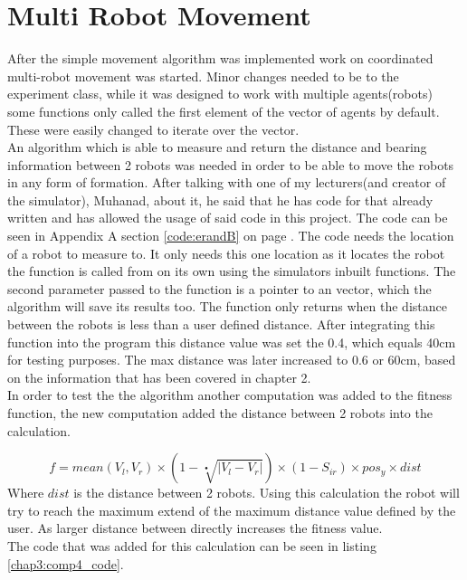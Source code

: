 \section{Multi Robot Movement}
After the simple movement algorithm was implemented work on coordinated multi-robot movement was started.
Minor changes needed to be to the experiment class, while it was designed to work with multiple agents(robots) some functions only called the first element of the vector of agents by default. These were easily changed to iterate over the vector. \\

An algorithm which is able to measure and return the distance and bearing information between 2 robots was needed in order to be able to move the robots in any form of formation. After talking with one of my lecturers(and creator of the simulator), Muhanad,  about it, he said that he has code for that already written and has allowed the usage of said code in this project. The code can be seen in Appendix A section \ref{code:erandB} on page \pageref{code:erandB}.
The code needs the location of a robot to measure to. It only needs this one location as it locates the robot the function is called from on its own using the simulators inbuilt functions.  The second parameter passed to the function is a pointer to an vector, which the algorithm will save its results too. 
The function only returns when the distance between the robots is less than a user defined distance. After integrating this function into the program this distance value was set the 0.4, which equals 40cm for testing purposes. 
The max distance was later increased to 0.6 or 60cm, based on the information that has been covered in chapter 2. \\

In order to test the the algorithm another computation was added to the fitness function, the new computation added the distance between 2 robots into the calculation.

\begin{equation}
f = mean(V_l, V_r) \times ( 1 - \sqrt[•]{|V_l - V_r|}) \times (1 - S_{ir}) \times pos_y \times dist
\end{equation}
Where $dist$ is the distance between 2 robots. Using this calculation the robot will try to reach the maximum extend of the maximum distance value defined by the user.
As larger distance between directly increases the fitness value. \\
The code that was added for this calculation can be seen in listing \ref{chap3:comp4_code}.

